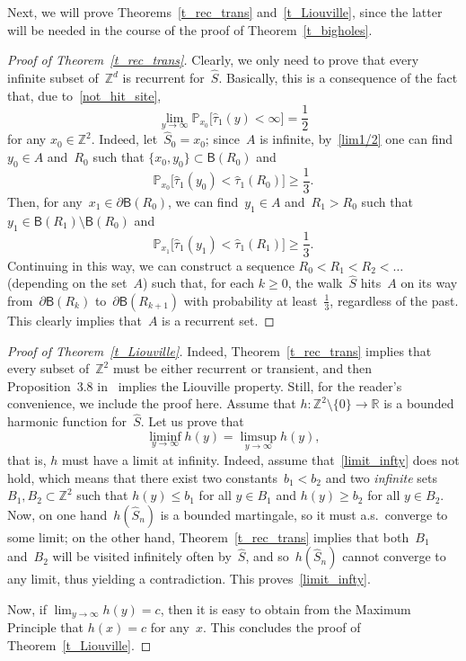 \documentclass[AHL,Unicode,longabstracts]{cedram}
\newcommand{\1}[1]{{\mathbf 1}{\{#1\}}}
\newcommand{\Z}{\mathbb{Z}}
\newcommand{\R}{{\mathbb R}}
\newcommand{\s}{{\widehat S}}
\newcommand{\8}{{\infty}}
\newcommand{\IP}{{\mathbb P}}
\newcommand{\htau}{\widehat{\tau}}
\newcommand{\B}{{\mathsf B}}
\begin{document}
Next, we will prove Theorems~\ref{t_rec_trans} and~\ref{t_Liouville}, since the latter will be needed in the course of the proof of Theorem~\ref{t_bigholes}.

\begin{proof}[Proof of Theorem~\ref{t_rec_trans}]
Clearly, we only need to prove that every infinite subset of~$\Z^d$ is recurrent for~$\s$. Basically, this is a consequence of the fact that, due to~\eqref{not_hit_site},
\begin{equation}\label{lim1/2}
\lim_{y\to\infty} \IP_{x_0}\big[\htau_1(y)<\infty\big] = \frac{1}{2}
\end{equation}
for any $x_0\in\Z^2$. Indeed, let~$\s_0=x_0$; since~$A$ is infinite, by~\eqref{lim1/2} one can find~$y_0\in A$ and~$R_0$ such that $\{x_0,y_0\}\subset \B(R_0)$ and
\[
\IP_{x_0}\big[\htau_1(y_0)<\htau_1(R_0)\big] \geq \frac{1}{3}.
\]
Then, for any~$x_1\in \partial\B(R_0)$, we can find~$y_1\in A$ and~$R_1>R_0$ such that $y_1\in \B(R_1)\setminus \B(R_0)$ and
\[
\IP_{x_1}\big[\htau_1(y_1)<\htau_1(R_1)\big] \geq \frac{1}{3}.
\]
Continuing in this way, we can construct a sequence $R_0<R_1<R_2<\ldots$ (depending on the set~$A$) such that, for each $k\geq 0$, the walk~$\s$ hits~$A$ on its way from~$\partial\B(R_k)$ to~$\partial\B(R_{k+1})$ with probability at least~$\frac{1}{3}$, regardless of the past. This clearly implies that~$A$ is a recurrent set.
\end{proof}

\begin{proof}[Proof of Theorem~\ref{t_Liouville}]
Indeed, Theorem~\ref{t_rec_trans} implies that every subset of~$\Z^2$ must be either recurrent or transient, and then Proposition~3.8 in~\cite[Chapter~2]{R84} implies the Liouville property. Still, for the reader's convenience, we include the proof here. Assume that $h:\Z^2\setminus\{0\} \to \R$ is a bounded harmonic function for~$\s$. Let us prove that
\begin{equation}\label{limit_infty}
\liminf_{y\to \infty}h(y) = \limsup_{y\to \infty}h(y),
\end{equation}
that is, $h$ must have a limit at infinity. Indeed, assume that~\eqref{limit_infty} does not hold, which means that there exist two constants~$b_1<b_2$ and two \emph{infinite} sets $B_1,B_2\subset\Z^2$ such that $h(y)\leq b_1$ for all $y\in B_1$ and $h(y) \geq b_2$ for all $y\in B_2$. Now, on one hand~$h(\s_n)$ is a bounded martingale, so it must a.s.\ converge to some limit; on the other hand, Theorem~\ref{t_rec_trans} implies that both~$B_1$ and~$B_2$ will be visited infinitely often by~$\s$, and so~$h(\s_n)$ cannot converge to any limit, thus yielding a contradiction. This proves~\eqref{limit_infty}.

Now, if $\lim_{y\to \infty}h(y)=c$, then it is easy to obtain from the Maximum Principle that $h(x)=c$ for any~$x$. This concludes the proof of Theorem~\ref{t_Liouville}.
\end{proof}
\end{document}
